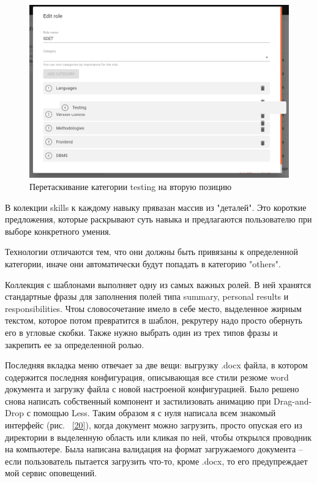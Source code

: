 \documentclass[a4paper,12pt]{diplom}
\begin{document}
\begin{figure}[!ht]
	\centering
	\includegraphics[width=1\textwidth]{resources/roles.png}
	\caption{Перетаскивание категории testing на вторую позицию}
	\label{19}
\end{figure}

В колекции skills к каждому навыку прявазан массив из "деталей". Это короткие предложения, которые раскрывают суть навыка и предлагаются пользователю при выборе конкретного умения.

Технологии отличаются тем, что они должны быть привязаны к определенной категории, иначе они автоматически будут попадать в категорию "others".

Коллекция с шаблонами выполняет одну из самых важных ролей. В ней хранятся стандартные фразы для заполнения полей типа summary, personal results и responsibilities. Чтоы словосочетание имело в себе место, выделенное жирным текстом, которое потом превратится в шаблон, рекрутеру надо просто обернуть его в угловые скобки.
Также нужно выбрать один из трех типов фразы и закрепить ее за определенной ролью.

Последняя вкладка меню отвечает за две вещи: выгрузку .docx файла, в котором содержится последняя конфигурация, описывающая все стили резюме word документа и загрузку файла с новой настроеной конфигурацией.
Было решено снова написать собственный компонент и застилизовать анимацию при Drag-and-Drop с помощью Less. Таким образом я с нуля написала всем знакомый интерфейс (рис. ~\ref{20}), когда документ можно загрузить, просто опуская его из директории в выделенную область или кликая по ней, чтобы открылся проводник на компьютере. Была написана валидация на формат загружаемого документа -- если пользователь пытается загрузить что-то, кроме .docx, то его предупреждает мой сервис оповещений.
\end{document}
